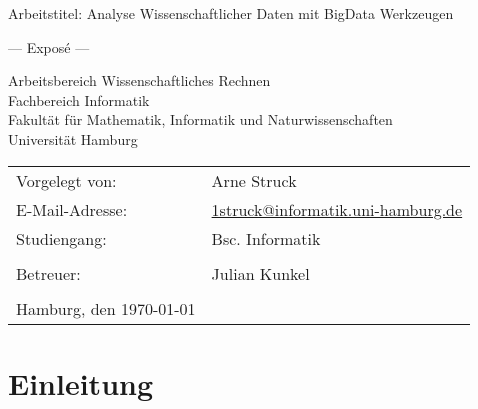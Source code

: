 \documentclass[
	12pt,
	a4paper,
	BCOR10mm,
	DIV14,
	listof=totoc,
	bibliography=totoc,
	headsepline
]{scrreprt}
\begin{document}
\begin{titlepage}
	\begin{center}
		{\titlefont\huge Arbeitstitel: Analyse Wissenschaftlicher Daten mit BigData Werkzeugen \par}

		\bigskip
		\bigskip

		{\titlefont\Large --- Exposé ---\par}

		\bigskip
		\bigskip

		{\large Arbeitsbereich Wissenschaftliches Rechnen\\
		Fachbereich Informatik\\
		Fakultät für Mathematik, Informatik und Naturwissenschaften\\
		Universität Hamburg\par}
	\end{center}

	\vfill

	{\large \begin{tabular}{ll}
		Vorgelegt von: & Arne Struck \\
		E-Mail-Adresse: 
			& \href{mailto:1struck@informatik.uni-hamburg.de}{1struck@informatik.uni-hamburg.de} \\ 
		Studiengang: & Bsc. Informatik \\
		\\
		Betreuer: & Julian Kunkel \\
		\\
		Hamburg, den \today
	\end{tabular}\par}
\end{titlepage}

\thispagestyle{empty}

\newpage\null\thispagestyle{empty}\newpage
\tableofcontents
\newpage\null\thispagestyle{empty}\newpage

\chapter{Einleitung}
\label{einleitung}
\end{document}
